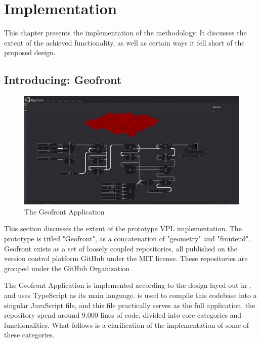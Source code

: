\chapter{Implementation}%
\label{chap:implementation}
This chapter presents the implementation of the methodology. 
It discusses the extent of the achieved functionality, as well as certain ways it fell short of the proposed design.

\section{Introducing: Geofront}
\label{sec:implementation:app}

\begin{note}
  
\end{note}

\begin{figure}
  \centering
  \graphicspath{ {../../assets/images/implementation/} }
  \includegraphics[width=\linewidth]{full-application.png}
  \caption[Geofront]{The Geofront Application}
  \label{fig:geofront-app}
\end{figure}

This section discusses the extent of the prototype \ac{VPL} implementation. 
The prototype is titled "Geofront", as a concatenation of "geometry" and "frontend".
Geofront exists as a set of loosely coupled repositories, all published on the version control platform GitHub under the MIT license. These repositories are grouped under the GitHub Organization  .


The Geofront Application is implemented according to the design layed out in , and uses TypeScript as its main language. 
 is used to compile this codebase into a singular JavaScript file, and this file practically serves as the full application. 
the repository spend around 9.000 lines of code, divided into core categories and functionalities.
What follows is a clarification of the implementation of some of these categories.

